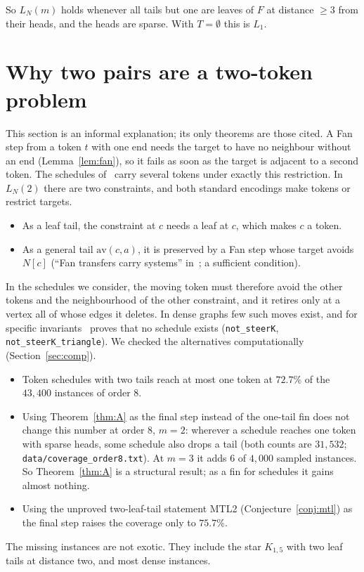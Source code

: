 \documentclass[11pt]{amsart}
\theoremstyle{definition}
\begin{document}
So $L_N(m)$ holds whenever all tails but one are leaves of $F$ at distance $\ge3$ from their heads,
and the heads are sparse. With $T=\emptyset$ this is $L_1$.

\section{Why two pairs are a two-token problem}\label{sec:two}

This section is an informal explanation; its only theorems are those cited. A Fan step from a token
$t$ with one end needs the target to have no neighbour without an end (Lemma~\ref{lem:fan}), so it
fails as soon as the target is adjacent to a second token. The schedules of~\cite{MT} carry several
tokens under exactly this restriction. In $L_N(2)$ there are two constraints, and both standard
encodings make tokens or restrict targets.
\begin{itemize}
\item As a leaf tail, the constraint at $c$ needs a leaf at $c$, which makes $c$ a token.
\item As a general tail $\mathrm{av}(c,a)$, it is preserved by a Fan step whose target avoids
$N[c]$ (``Fan transfers carry systems'' in~\cite{CLT}; a sufficient condition).
\end{itemize}
In the schedules we consider, the moving token must therefore avoid the other tokens and the
neighbourhood of the other constraint, and it retires only at a vertex all of whose edges it
deletes. In dense graphs few such moves exist, and for specific invariants~\cite{MT} proves that no
schedule exists (\texttt{not\_steerK}, \texttt{not\_steerK\_triangle}). We checked the alternatives
computationally (Section~\ref{sec:comp}).
\begin{itemize}
\item Token schedules with two tails reach at most one token at $72.7\%$ of the $43{,}400$
instances of order $8$.
\item Using Theorem~\ref{thm:A} as the final step instead of the one-tail fin does not change this
number at order $8$, $m=2$: wherever a schedule reaches one token with sparse heads, some schedule
also drops a tail (both counts are $31{,}532$; \texttt{data/coverage\_order8.txt}). At $m=3$ it adds
$6$ of $4{,}000$ sampled instances. So Theorem~\ref{thm:A} is a structural result; as a
fin for schedules it gains almost nothing.
\item Using the unproved two-leaf-tail statement MTL2 (Conjecture~\ref{conj:mtl}) as the final step
raises the coverage only to $75.7\%$.
\end{itemize}
The missing instances are not exotic. They include the star $K_{1,5}$ with two leaf tails at
distance two, and most dense instances.
\end{document}
